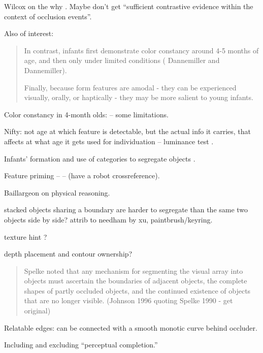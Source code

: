 Wilcox on the why \cite{wilcox99object}.  Maybe don't get
``sufficient contrastive evidence within the context of
occlusion events''.


Also of interest:

\begin{quote}

In contrast, infants first demonstrate color constancy around 4-5
months of age, and then only under limited conditions ( Dannemiller
and Dannemiller).

Finally, because form features are amodal - they can be
experienced visually, orally, or haptically - they may be more
salient to young infants.

\end{quote}

Color constancy in 4-month olds: \cite{dannemiller87test} -- some 
limitations.

Nifty: not age at which feature is detectable, but the actual
info it carries, that affects at what age it gets used for
individuation -- luminance test \cite{woods05infants}.

Infants' formation and use of categories to segregate objects 
\cite{needham05infants}.

Feature priming -- \cite{wilcox04priming}
--
(have a robot crossreference).

Baillargeon on physical reasoning.




stacked objects sharing a boundary are harder
to segregate than the same two objects
side by side?  attrib to needham by xu,
paintbrush/keyring.

\cite{smith03motion}

texture hint \cite{johnson96perception}?

depth placement and contour ownership?

\begin{quote}

Spelke noted that any mechanism for segmenting the visual array
into objects must ascertain the boundaries of adjacent objects,
the complete shapes of partly occluded objects, and the continued
existence of objects that are no longer visible.
(Johnson 1996 quoting Spelke 1990 - get original)

\end{quote}

Relatable edges: can be connected with a smooth monotic
curve behind occluder.

Including and excluding ``perceptual completion.''

